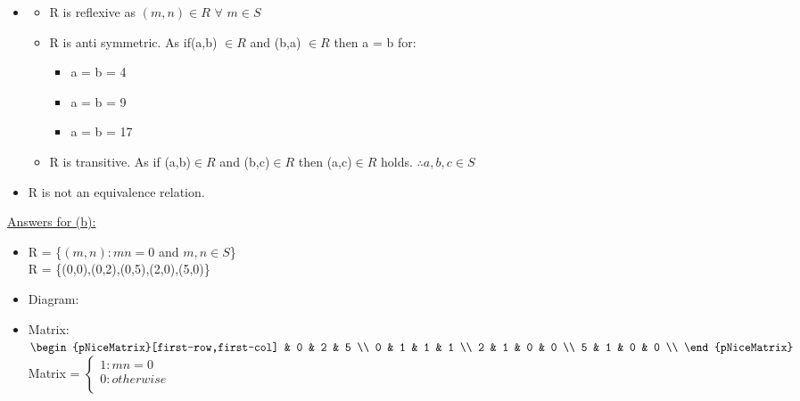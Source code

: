 \documentclass{article}
\newcommand{\R}{\mathbb{R}}
\begin{document}
\begin{enumerate}
\begin{itemize}
    \item \begin{itemize}
       \item R is reflexive as $(m,n) \in R$ $\forall$ $m \in S$
       \item R is anti symmetric. As if(a,b) $\in R$ and (b,a) $\in R$ then a = b for: 
        \begin{itemize}
            \item[] a = b = 4 
            \item[] a = b = 9 
            \item[] a = b = 17
        \end{itemize}
        \item R is transitive. As if (a,b)$\in R$ and (b,c)$\in R$ then (a,c)$\in R$ holds. $\therefore a,b,c \in S$  
     \end{itemize}
    \item R is not an equivalence relation.
    
\end{itemize}

\pagebreak

\underline{Answers for (b):}    

\begin{itemize}
    \item R = \{$(m,n):mn = 0$ and $m,n \in S$\}
    \\R = \{(0,0),(0,2),(0,5),(2,0),(5,0)\}\\

    \item Diagram:\\

    \item Matrix:\\
        $\begin{pNiceMatrix}[first-row,first-col]
           & 0 & 2 & 5        \\
        0  & 1 & 1 & 1        \\ 
        2  & 1 & 0 & 0        \\
        5  & 1 & 0 & 0        \\
        \end{pNiceMatrix}$
        \hspace{1cm} Matrix = 
        $\begin{cases}
            1: mn = 0 \\
            0: otherwise\\  
        \end{cases}$ \\
    

\end{itemize}
\end{enumerate}
\end{document}
